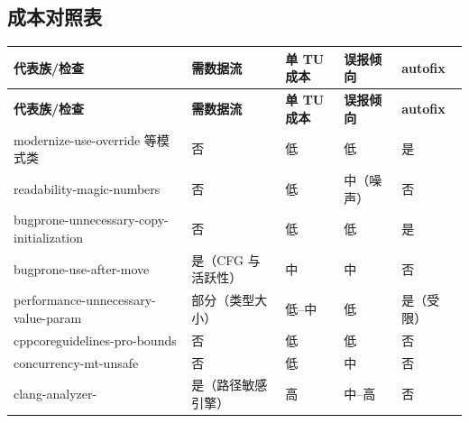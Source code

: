 \documentclass[12pt,a4paper,fontset=fandol]{ctexbook}
\newcommand{\Bk}{\discretionary{}{}{}}
\begin{document}
\subsection{成本对照表}\label{sec:ch12-s2b}
{\small
\begin{longtable}{>{\raggedright\arraybackslash}p{} >{\raggedright\arraybackslash}p{} >{\raggedright\arraybackslash}p{} >{\raggedright\arraybackslash}p{} >{\raggedright\arraybackslash}p{}}
\textbf{代表族/检查} & \textbf{需数据流} & \textbf{单 TU 成本} & \textbf{误报倾向} & \textbf{autofix}\\ \midrule
\endfirsthead
\textbf{代表族/检查} & \textbf{需数据流} & \textbf{单 TU 成本} & \textbf{误报倾向} & \textbf{autofix}\\ \midrule
\endhead
modernize-\allowbreak use-\allowbreak override 等模式类 & 否 & 低 & 低 & 是\\
readability-\Bk magic-numbers & 否 & 低 & 中（噪声） & 否\\bugprone-unnecessary-copy-initialization & 否 & 低 & 低 & 是\\
bugprone-use-after-move & 是（CFG 与活跃性） & 中 & 中 & 否\\
performance-unnecessary-value-param & 部分（类型大小） & 低--中 & 低 & 是（受限）\\
cppcoreguidelines-pro-bounds & 否 & 低 & 低 & 否\\
concurrency-mt-unsafe & 否 & 低 & 中 & 否\\
clang-analyzer-\Bk{*} & 是（路径敏感引擎） & 高 & 中--高 & 否\\
\end{longtable}}
\end{document}
